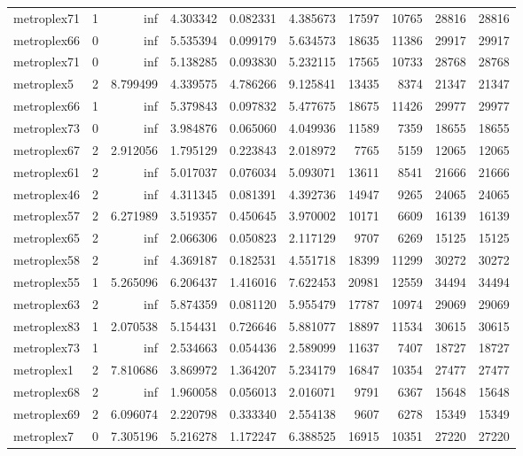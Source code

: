 \begin{longtable}{|l|r|r|r|r|r|r|r|r|r|}
metroplex71 & 1 & inf & 4.303342 & 0.082331 & 4.385673 & 17597 & 10765 & 28816 & 28816 \\
metroplex66 & 0 & inf & 5.535394 & 0.099179 & 5.634573 & 18635 & 11386 & 29917 & 29917 \\
metroplex71 & 0 & inf & 5.138285 & 0.093830 & 5.232115 & 17565 & 10733 & 28768 & 28768 \\
metroplex5 & 2 & 8.799499 & 4.339575 & 4.786266 & 9.125841 & 13435 & 8374 & 21347 & 21347 \\
metroplex66 & 1 & inf & 5.379843 & 0.097832 & 5.477675 & 18675 & 11426 & 29977 & 29977 \\
metroplex73 & 0 & inf & 3.984876 & 0.065060 & 4.049936 & 11589 & 7359 & 18655 & 18655 \\
metroplex67 & 2 & 2.912056 & 1.795129 & 0.223843 & 2.018972 & 7765 & 5159 & 12065 & 12065 \\
metroplex61 & 2 & inf & 5.017037 & 0.076034 & 5.093071 & 13611 & 8541 & 21666 & 21666 \\
metroplex46 & 2 & inf & 4.311345 & 0.081391 & 4.392736 & 14947 & 9265 & 24065 & 24065 \\
metroplex57 & 2 & 6.271989 & 3.519357 & 0.450645 & 3.970002 & 10171 & 6609 & 16139 & 16139 \\
metroplex65 & 2 & inf & 2.066306 & 0.050823 & 2.117129 & 9707 & 6269 & 15125 & 15125 \\
metroplex58 & 2 & inf & 4.369187 & 0.182531 & 4.551718 & 18399 & 11299 & 30272 & 30272 \\
metroplex55 & 1 & 5.265096 & 6.206437 & 1.416016 & 7.622453 & 20981 & 12559 & 34494 & 34494 \\
metroplex63 & 2 & inf & 5.874359 & 0.081120 & 5.955479 & 17787 & 10974 & 29069 & 29069 \\
metroplex83 & 1 & 2.070538 & 5.154431 & 0.726646 & 5.881077 & 18897 & 11534 & 30615 & 30615 \\
metroplex73 & 1 & inf & 2.534663 & 0.054436 & 2.589099 & 11637 & 7407 & 18727 & 18727 \\
metroplex1 & 2 & 7.810686 & 3.869972 & 1.364207 & 5.234179 & 16847 & 10354 & 27477 & 27477 \\
metroplex68 & 2 & inf & 1.960058 & 0.056013 & 2.016071 & 9791 & 6367 & 15648 & 15648 \\
metroplex69 & 2 & 6.096074 & 2.220798 & 0.333340 & 2.554138 & 9607 & 6278 & 15349 & 15349 \\
metroplex7 & 0 & 7.305196 & 5.216278 & 1.172247 & 6.388525 & 16915 & 10351 & 27220 & 27220 \\

\end{longtable}
